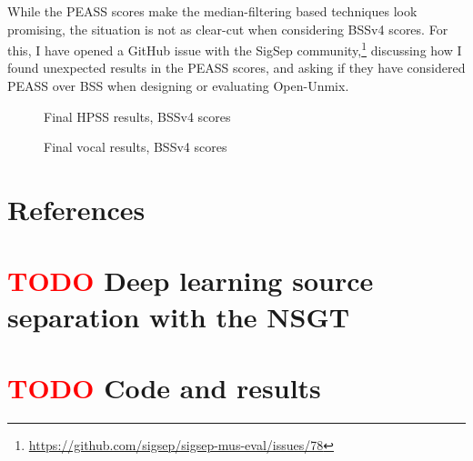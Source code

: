 \documentclass[letter,12pt]{article}
\begin{document}
While the PEASS scores make the median-filtering based techniques look promising, the situation is not as clear-cut when considering BSSv4 scores. For this, I have opened a GitHub issue with the SigSep community,\footnote{\url{https://github.com/sigsep/sigsep-mus-eval/issues/78}} discussing how I found unexpected results in the PEASS scores, and asking if they have considered PEASS over BSS when designing or evaluating Open-Unmix.

\begin{figure}[ht]
	\centering
	\caption{Final HPSS results, BSSv4 scores}
	\label{fig:bssv4hpss}
	\vspace{1em}
	\caption{Final vocal results, BSSv4 scores}
	\label{fig:bssv4vocal}
\end{figure}

\vfill
\clearpage %

\section{References}
\printbibliography[heading=none]

\vfill
\clearpage %

\begin{appendices}

\section{\textbf{\textcolor{red}{TODO }}Deep learning source separation with the NSGT}

\section{\textbf{\textcolor{red}{TODO }}Code and results}

\end{appendices}
\end{document}
